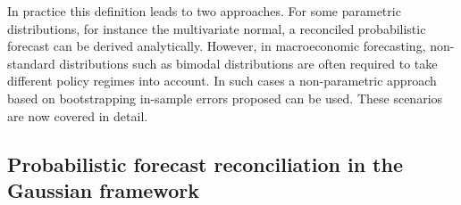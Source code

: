 \documentclass[graybox]{svmult}
\begin{document}
In practice this definition leads to two approaches.  For some parametric distributions, for instance the multivariate normal,  a reconciled probabilistic forecast can be derived analytically.  However, in macroeconomic forecasting, non-standard distributions such as bimodal distributions are often required to take different policy regimes into account.  In such cases a non-parametric approach based on bootstrapping in-sample errors proposed \cite{Gamakumara2018} can be used.  These scenarios are now covered in detail.

\subsection{Probabilistic forecast reconciliation in the Gaussian framework}\label{sec:probrecgauss}


\end{document}
